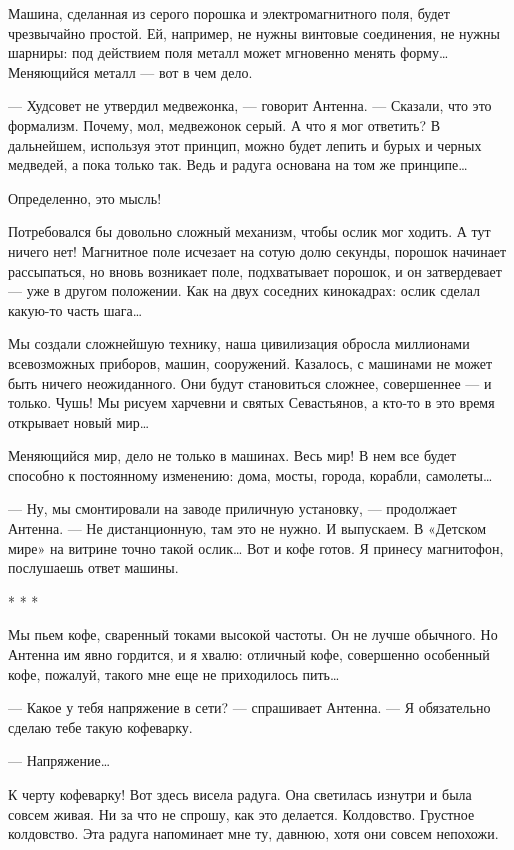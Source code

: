 Машина, сделанная  из  серого  порошка  и  электромагнитного  поля,  будет
чрезвычайно простой. Ей, например, не нужны винтовые соединения, не  нужны
шарниры:  под  действием  поля   металл  может  мгновенно  менять   форму…
Меняющийся металл — вот в чем дело.

— Худсовет не утвердил медвежонка, —  говорит Антенна. — Сказали, что  это
формализм. Почему,  мол,  медвежонок  серый.  А  что  я  мог  ответить?  В
дальнейшем, используя этот принцип,  можно будет лепить  и бурых и  черных
медведей, а пока только так. Ведь и радуга основана на том же принципе…

Определенно, это мысль!

Потребовался бы довольно сложный механизм,  чтобы ослик мог ходить. А  тут
ничего нет!  Магнитное  поле  исчезает  на  сотую  долю  секунды,  порошок
начинает рассыпаться, но вновь возникает поле, подхватывает порошок, и  он
затвердевает — уже в  другом положении. Как  на двух соседних  кинокадрах:
ослик сделал какую-то часть шага…

Мы  создали  сложнейшую  технику,  наша  цивилизация  обросла   миллионами
всевозможных приборов, машин,  сооружений. Казалось, с  машинами не  может
быть ничего неожиданного. Они будут  становиться сложнее, совершеннее —  и
только. Чушь! Мы  рисуем харчевни  и святых  Севастьянов, а  кто-то в  это
время открывает новый мир…

Меняющийся мир,  дело не  только в  машинах.  Весь мир!  В нем  все  будет
способно к постоянному изменению: дома, мосты, города, корабли, самолеты…

—  Ну,  мы  смонтировали  на  заводе  приличную  установку,  —  продолжает
Антенна. — Не  дистанционную, там это  не нужно. И  выпускаем. В  «Детском
мире»  на  витрине  точно  такой  ослик…  Вот  и  кофе  готов.  Я  принесу
магнитофон, послушаешь ответ машины.

* * *

Мы пьем кофе, сваренный токами высокой  частоты. Он не лучше обычного.  Но
Антенна им явно гордится, и  я хвалю: отличный кофе, совершенно  особенный
кофе, пожалуй, такого мне еще не приходилось пить…

— Какое у тебя  напряжение в сети? —  спрашивает Антенна. — Я  обязательно
сделаю тебе такую кофеварку.

— Напряжение…

К черту кофеварку! Вот здесь висела  радуга. Она светилась изнутри и  была
совсем живая. Ни за что не спрошу, как это делается. Колдовство.  Грустное
колдовство.  Эта  радуга  напоминает  мне  ту,  давнюю,  хотя  они  совсем
непохожи.

